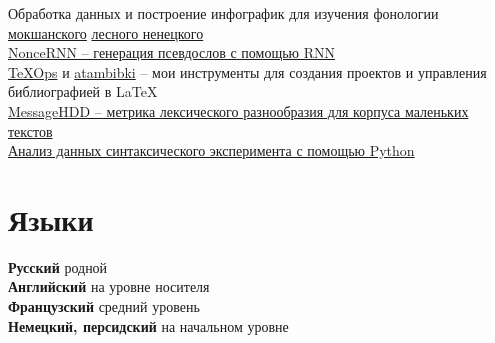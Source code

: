 \documentclass[11pt]{article} %
\begin{document}
Обработка данных и построение инфографик для изучения фонологии \href{https://github.com/thddbptnsndshs/tolerance_principle_moksha}{мокшанского} \href{https://github.com/thddbptnsndshs/forest_nenets_vowels/tree/develop}{лесного ненецкого}\\
\href{https://github.com/thddbptnsndshs/nonce-words}{NonceRNN -- генерация псевдослов с помощью RNN}\\
\href{https://github.com/thddbptnsndshs/texops}{TeXOps} и \href{https://github.com/thddbptnsndshs/atambibki}{atambibki} -- мои инструменты для создания проектов и управления библиографией в LaTeX\\
\href{https://github.com/thddbptnsndshs/MessageHDD}{MessageHDD -- метрика лексического разнообразия для корпуса маленьких текстов}\\
\href{https://github.com/thddbptnsndshs/idioms}{Анализ данных синтаксического эксперимента с помощью Python}\\

\section*{Языки}

\textbf{Русский} родной\\
\textbf{Английский} на уровне носителя\\
\textbf{Французский} средний уровень \\
\textbf{Немецкий, персидский} на начальном уровне




\end{document}
